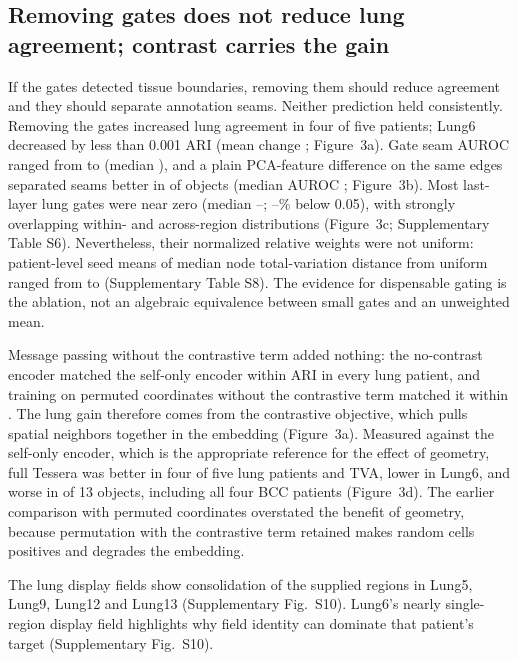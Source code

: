 \documentclass[11pt]{article}
\begin{document}
\subsection{Removing gates does not reduce lung agreement; contrast carries the gain}
If the gates detected tissue boundaries, removing them should reduce agreement and they should separate annotation seams. Neither prediction held consistently. Removing the gates increased lung agreement in four of five patients; Lung6 decreased by less than 0.001 ARI (mean change \NoGateMean{}; Figure~3a). Gate seam AUROC ranged from \GateAurocMin{} to \GateAurocMax{} (median \GateAurocMedian{}), and a plain PCA-feature difference on the same edges separated seams better in \GateBeaten{} of \GateObjects{} objects (median AUROC \GateExprAurocMedian{}; Figure~3b). Most last-layer lung gates were near zero (median \LungGateMedianMin{}--\LungGateMedianMax{}; \LungGateLowMin{}--\LungGateLowMax{}\% below 0.05), with strongly overlapping within- and across-region distributions (Figure~3c; Supplementary Table S6). Nevertheless, their normalized relative weights were not uniform: patient-level seed means of median node total-variation distance from uniform ranged from \LungWeightTvdMin{} to \LungWeightTvdMax{} (Supplementary Table S8). The evidence for dispensable gating is the ablation, not an algebraic equivalence between small gates and an unweighted mean.

Message passing without the contrastive term added nothing: the no-contrast encoder matched the self-only encoder within \NoContrastSelfMaxGap{} ARI in every lung patient, and training on permuted coordinates without the contrastive term matched it within \PermNoContrastMaxGap{}. The lung gain therefore comes from the contrastive objective, which pulls spatial neighbors together in the embedding (Figure~3a). Measured against the self-only encoder, which is the appropriate reference for the effect of geometry, full Tessera was better in four of five lung patients and TVA, lower in Lung6, and worse in \BelowSelfOnly{} of 13 objects, including all four BCC patients (Figure~3d). The earlier comparison with permuted coordinates overstated the benefit of geometry, because permutation with the contrastive term retained makes random cells positives and degrades the embedding.



The lung display fields show consolidation of the supplied regions in Lung5, Lung9, Lung12 and Lung13 (Supplementary Fig.~S10). Lung6's nearly single-region display field highlights why field identity can dominate that patient's target (Supplementary Fig.~S10).
\end{document}
